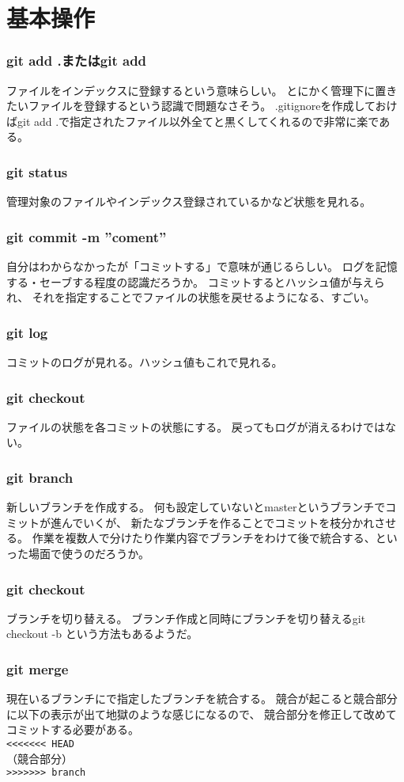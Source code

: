 \section{基本操作}
\subsubsection{git add .またはgit add }
ファイルをインデックスに登録するという意味らしい。
とにかく管理下に置きたいファイルを登録するという認識で問題なさそう。
.gitignoreを作成しておけばgit add .で指定されたファイル以外全てと黒くしてくれるので非常に楽である。
\subsubsection{git  status}
管理対象のファイルやインデックス登録されているかなど状態を見れる。
\subsubsection{git commit -m  ''coment''}
自分はわからなかったが「コミットする」で意味が通じるらしい。
ログを記憶する・セーブする程度の認識だろうか。
コミットするとハッシュ値が与えられ、
それを指定することでファイルの状態を戻せるようになる、すごい。
\subsubsection{git log}
コミットのログが見れる。ハッシュ値もこれで見れる。
\subsubsection{git checkout }
ファイルの状態を各コミットの状態にする。
戻ってもログが消えるわけではない。
\subsubsection{git branch }
新しいブランチを作成する。
何も設定していないとmasterというブランチでコミットが進んでいくが、
新たなブランチを作ることでコミットを枝分かれさせる。
作業を複数人で分けたり作業内容でブランチをわけて後で統合する、といった場面で使うのだろうか。
\subsubsection{git checkout }
ブランチを切り替える。
ブランチ作成と同時にブランチを切り替えるgit checkout -b という方法もあるようだ。
\subsubsection{git merge }
現在いるブランチにで指定したブランチを統合する。
競合が起こると競合部分に以下の表示が出て地獄のような感じになるので、
競合部分を修正して改めてコミットする必要がある。\\
\texttt{<<<<<<< HEAD}\\
（競合部分）\\
\texttt{>>>>>>> branch}
